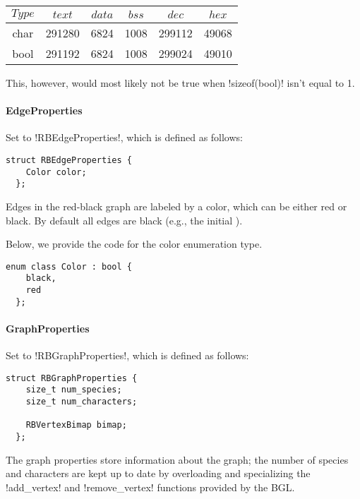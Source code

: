 \begin{center}
  \begin{tabular}{c | c c c c c}
    $Type$ & $text$ & $data$ & $bss$ & $dec$  & $hex$ \\
    \hline
    char   & 291280 & 6824   & 1008  & 299112 & 49068 \\
    bool   & 291192 & 6824   & 1008  & 299024 & 49010
  \end{tabular}
\end{center}

This, however, would most likely not be true when !sizeof(bool)! isn't equal to 1.

\paragraph{EdgeProperties}

Set to !RBEdgeProperties!, which is defined as follows:

\begin{lstlisting}[moreemph={Color}]
  struct RBEdgeProperties {
    Color color;
  };
\end{lstlisting}

Edges in the red-black graph are labeled by a color, which can be either red or black. By default all edges are black (e.g., the initial \grb{}).

Below, we provide the code for the color enumeration type.

\begin{lstlisting}[belowskip=0pt]
  enum class Color : bool {
    black,
    red
  };
\end{lstlisting}

\paragraph{GraphProperties}

Set to !RBGraphProperties!, which is defined as follows:

\begin{lstlisting}[moreemph={RBVertexBimap}]
  struct RBGraphProperties {
    size_t num_species;
    size_t num_characters;

    RBVertexBimap bimap;
  };
\end{lstlisting}

The graph properties store information about the graph; the number of species and characters are kept up to date by overloading and specializing the !add_vertex! and !remove_vertex! functions provided by the BGL.

